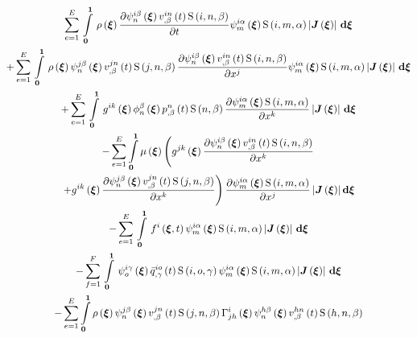 \begin{multline}
  \gsum{e=1}{E}{\gint{\vectr{0}}{\vectr{1}}{\fnof{\rho}{\vectr{\xi}}\delby{\idxgbfn{i}{n}{\beta}{\vectr{\xi}}
  \fnof{\idxnodedof{v}{i}{n}{\beta}}{t}\idxgsf{i}{n}{\beta}}{t}\idxgbfn{i}{m}{\alpha}{\vectr{\xi}}\idxgsf{i}{m}{\alpha}\abs{\fnof{\matr{J}}{\vectr{\xi}}}}{\vectr{\xi}}}\\
  +\gsum{e=1}{E}{\gint{\vectr{0}}{\vectr{1}}{\fnof{\rho}{\vectr{\xi}}\idxgbfn{j}{n}{\beta}{\vectr{\xi}}
  \fnof{\idxnodedof{v}{j}{n}{\beta}}{t}\idxgsf{j}{n}{\beta}\delby{\idxgbfn{i}{n}{\beta}{\vectr{\xi}}
  \fnof{\idxnodedof{v}{i}{n}{\beta}}{t}\idxgsf{i}{n}{\beta}}{x^{j}}\idxgbfn{i}{m}{\alpha}{\vectr{\xi}}\idxgsf{i}{m}{\alpha}\abs{\fnof{\matr{J}}{\vectr{\xi}}}}{\vectr{\xi}}}\\
  +\gsum{e=1}{E}{\gint{\vectr{0}}{\vectr{1}}{\fnof{g^{ik}}{\vectr{\xi}}\altgbfn{n}{\beta}{\vectr{\xi}}
  \fnof{\nodedof{p}{n}{\beta}}{t}\gsf{n}{\beta}\delby{\idxgbfn{i}{m}{\alpha}{\vectr{\xi}}\idxgsf{i}{m}{\alpha}}{x^{k}}\abs{\fnof{\matr{J}}{\vectr{\xi}}}}{\vectr{\xi}}}\\
  -\dsuml{e=1}{E}\dintl{\vectr{0}}{\vectr{1}}\fnof{\mu}{\vectr{\xi}}\left(\fnof{g^{jk}}{\vectr{\xi}}\delby{\idxgbfn{i}{n}{\beta}{\vectr{\xi}}
      \fnof{\idxnodedof{v}{i}{n}{\beta}}{t}\idxgsf{i}{n}{\beta}}{x^{k}}\right.\\
    \left.+\fnof{g^{ik}}{\vectr{\xi}}\delby{\idxgbfn{j}{n}{\beta}{\vectr{\xi}}
  \fnof{\idxnodedof{v}{j}{n}{\beta}}{t}\idxgsf{j}{n}{\beta}}{x^{k}}\right)\delby{\idxgbfn{i}{m}{\alpha}{\vectr{\xi}}\idxgsf{i}{m}{\alpha}}{x^{j}}\abs{\fnof{\matr{J}}{\vectr{\xi}}}\exteriorderiv{\vectr{\xi}} \\
  -\gsum{e=1}{E}{\gint{\vectr{0}}{\vectr{1}}{\fnof{f^{i}}{\vectr{\xi},t}\idxgbfn{i}{m}{\alpha}{\vectr{\xi}}\idxgsf{i}{m}{\alpha}\abs{\fnof{\matr{J}}{\vectr{\xi}}}}{\vectr{\xi}}}\\
  -\gsum{f=1}{F}{\gint{\vectr{0}}{\vectr{1}}{\idxgbfn{i}{o}{\gamma}{\vectr{\xi}}
      \fnof{\idxnodedof{\bar{q}}{i}{o}{\gamma}}{t}\idxgsf{i}{o}{\gamma}\idxgbfn{i}{m}{\alpha}{\vectr{\xi}}\idxgsf{i}{m}{\alpha}\abs{\fnof{\matr{J}}{\vectr{\xi}}}}{\vectr{\xi}}}\\
  -\dsuml{e=1}{E} \dintl{\vectr{0}}{\vectr{1}} \fnof{\rho}{\vectr{\xi}}
  \idxgbfn{j}{n}{\beta}{\vectr{\xi}}
  \fnof{\idxnodedof{v}{j}{n}{\beta}}{t}\idxgsf{j}{n}{\beta}\fnof{\christoffel{i}{j}{h}}{\vectr{\xi}}
  \idxgbfn{h}{n}{\beta}{\vectr{\xi}}\fnof{\idxnodedof{v}{h}{n}{\beta}}{t}\idxgsf{h}{n}{\beta}

\end{multline}
